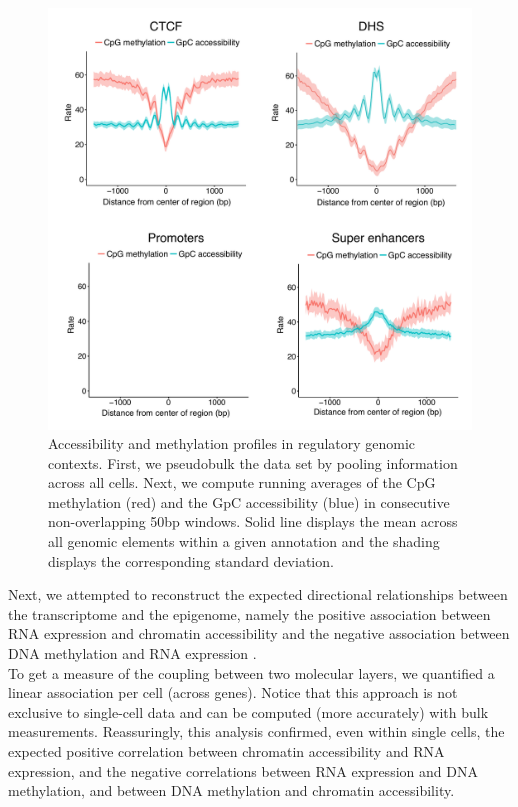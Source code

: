 \begin{figure}[H]
	\centering
	\includegraphics[width=0.8\linewidth]{scNMT_pseudobulk_profiles}
	\caption[]{Accessibility and methylation profiles in regulatory genomic contexts. First, we pseudobulk the data set by pooling information across all cells. Next, we compute running averages  of the CpG methylation (red) and the GpC accessibility (blue) in consecutive non-overlapping 50bp windows. Solid line displays the mean across all genomic elements within a given annotation and the shading displays the corresponding standard deviation.}
	\label{fig:scnmt_profiles}
\end{figure}

Next, we attempted to reconstruct the expected directional relationships between the transcriptome and the epigenome, namely the positive association between RNA expression and chromatin accessibility and the negative association between DNA methylation and RNA expression \cite{Thurman2012,Angermueller2016}.\\
To get a measure of the coupling between two molecular layers, we quantified a linear association per cell (across genes). Notice that this approach is not exclusive to single-cell data and can be computed (more accurately) with bulk measurements. Reassuringly, this analysis confirmed, even within single cells, the expected positive correlation between chromatin accessibility and RNA expression, and the negative correlations between RNA expression and DNA methylation, and between DNA methylation and chromatin accessibility.

